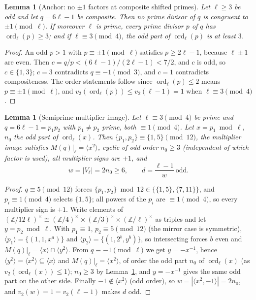 \documentclass[11pt]{article}
\theoremstyle{plain}
\newtheorem{lemma}[theorem]{Lemma}
\theoremstyle{definition}
\theoremstyle{remark}
\newcommand{\Z}{\mathbb Z}
\newcommand{\ord}{\operatorname{ord}}
\begin{document}
\begin{lemma}[Anchor: no $\pm1$ factors at composite shifted primes]
\label{lem:anchor-pm1}
Let $\ell\ge3$ be odd and let $q=6\ell-1$ be composite.  Then no prime
divisor of $q$ is congruent to $\pm1\pmod\ell$.  If moreover $\ell$ is
prime, every prime divisor $p$ of $q$ has $\ord_\ell(p)\ge3$; and if
$\ell\equiv3\pmod4$, the odd part of $\ord_\ell(p)$ is at least $3$.
\end{lemma}

\begin{proof}
An odd $p>1$ with $p\equiv\pm1\pmod\ell$ satisfies $p\ge2\ell-1$,
because $\ell\pm1$ are even.  Then $c=q/p<(6\ell-1)/(2\ell-1)<7/2$, and
$c$ is odd, so $c\in\{1,3\}$; $c=3$ contradicts $q\equiv-1\pmod3$, and
$c=1$ contradicts compositeness.  The order statements follow since
$\ord_\ell(p)\le2$ means $p\equiv\pm1\pmod\ell$, and
$v_2(\ord_\ell(p))\le v_2(\ell-1)=1$ when $\ell\equiv3\pmod4$.
\end{proof}

\begin{lemma}[Semiprime multiplier image]\label{lem:semiprime-image}
Let $\ell\equiv3\pmod4$ be prime and $q=6\ell-1=p_1p_2$ with
$p_1\ne p_2$ prime, both $\equiv1\pmod4$.  Let $x=p_1\bmod\ell$,
$n_0$ the odd part of $\ord_\ell(x)$.  Then
$\{p_1,p_2\}\equiv\{1,5\}\pmod{12}$, the multiplier image satisfies
$M(q)|_\ell=\langle x^2\rangle$, cyclic of odd order $n_0\ge3$
(independent of which factor is used), all multiplier signs are $+1$,
and
\[
  w=\bigl|V_\ell\bigr|=2n_0\ge6,\qquad d=\frac{\ell-1}{w}\ \text{odd}.
\]
\end{lemma}

\begin{proof}
$q\equiv5\pmod{12}$ forces $\{p_1,p_2\}\bmod12\in\{\{1,5\},\{7,11\}\}$,
and $p_i\equiv1\pmod4$ selects $\{1,5\}$; all powers of the $p_i$ are
$\equiv1\pmod4$, so every multiplier sign is $+1$.  Write elements of
$(\Z/12\ell)^\times\cong(\Z/4)^\times\times(\Z/3)^\times\times(\Z/\ell)^\times$
as triples and let $y=p_2\bmod\ell$.  With $p_1\equiv1$,
$p_2\equiv5\pmod{12}$ (the mirror case is symmetric),
$\langle p_1\rangle=\{(1,1,x^a)\}$ and
$\langle p_2\rangle=\{(1,2^b,y^b)\}$, so intersecting forces $b$ even
and $M(q)|_\ell=\langle x\rangle\cap\langle y^2\rangle$.  From
$q\equiv-1\pmod\ell$ we get $y=-x^{-1}$, hence
$\langle y^2\rangle=\langle x^2\rangle\subseteq\langle x\rangle$ and
$M(q)|_\ell=\langle x^2\rangle$, of order the odd part $n_0$ of
$\ord_\ell(x)$ (as $v_2(\ord_\ell(x))\le1$); $n_0\ge3$ by
Lemma~\ref{lem:anchor-pm1}, and $y=-x^{-1}$ gives the same odd part on
the other side.  Finally $-1\notin\langle x^2\rangle$ (odd order), so
$w=|\langle x^2,-1\rangle|=2n_0$, and $v_2(w)=1=v_2(\ell-1)$ makes $d$
odd.
\end{proof}
\end{document}
